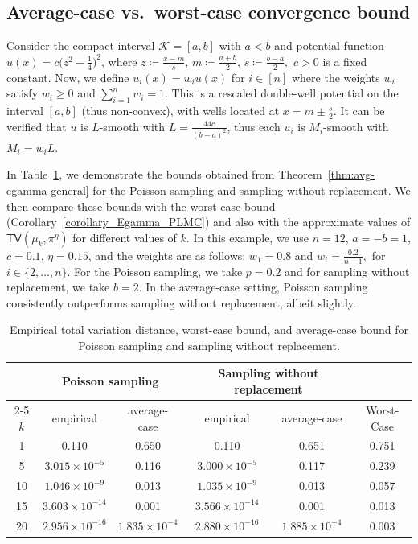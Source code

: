 \documentclass[10pt, journal]{IEEEtran}
\begin{document}
\subsection{Average-case vs.\ worst-case convergence bound}
\label{app:averageVSworst}
Consider the compact interval $\mathcal K=[a,b]$ with $a<b$ and potential function $u(x)=c\big(z^2-\tfrac14\big)^2$, where $z\coloneqq\frac{x-m}{s}$, $m\coloneqq \frac{a+b}{2}$,   $s\coloneqq \frac{b-a}{2},$ $c>0$ is a fixed constant. Now, we define $u_i(x) = w_i u(x)$ for $i\in [n]$ where the weights $w_i$ satisfy $w_i\geq 0$ and $\sum_{i=1}^nw_i=1$. This is a rescaled double-well potential on the interval $[a,b]$ (thus non-convex), with wells located at $x = m \pm \frac{s}{2}$. It can be verified that $u$ is $L$-smooth with $L = \tfrac{44c}{(b-a)^2}$, thus each $u_i$ is $M_i$-smooth with $M_i = w_i L$. 


In Table~\ref{tab:tv-poisson-swr2}, we demonstrate the bounds obtained from Theorem~\ref{thm:avg-egamma-general} for the Poisson sampling and sampling without replacement. We then compare these bounds with the worst-case bound (Corollary~\ref{corollary_Egamma_PLMC}) and also with the approximate values of $\mathsf{TV}(\mu_k, \pi^\eta)$ for different values of $k$. In this example, we use $n= 12$, $a = -b = 1$, $c=0.1$, $\eta=0.15$, and the weights are as follows: $w_1=0.8$ and $w_i=\frac{0.2}{n-1},$ for $i\in \{2,\dots,n\}$. For the Poisson sampling, we take $p = 0.2$ and for sampling without replacement, we take $b = 2$. In the average-case setting, Poisson sampling consistently outperforms sampling without replacement, albeit slightly.
\begin{table}[t]
\centering
\caption{Empirical total variation distance, worst-case bound, and average-case bound for Poisson sampling and sampling without replacement.}
\label{tab:tv-poisson-swr2}
\begin{tabular}{|c | c | c | c | c | c |}
\hline
 & \multicolumn{2}{c}{Poisson sampling} \vline & \multicolumn{2}{c}{Sampling without replacement} \vline & \\
 \cline{2-5}
$k$ & empirical & average-case & empirical & average-case & Worst-Case\\
\hline
1  & 0.110 & 0.650 & 0.110 & 0.651 & 0.751 \\
5  & $3.015\times 10^{-5}$ & 0.116 & $3.000\times 10^{-5}$ & 0.117 & 0.239\\
10 & $1.046\times 10^{-9}$ & 0.013 & $1.035\times 10^{-9}$ & 0.013 & 0.057\\
15 & $3.603\times 10^{-14}$ & 0.001 & $3.566\times 10^{-14}$ & 0.001 & 0.013\\
20 & $2.956\times 10^{-16}$ & $1.835\times 10^{-4}$ & $2.880\times 10^{-16}$ & $1.885\times 10^{-4}$ & 0.003 \\
\hline
\end{tabular}
\end{table}
\end{document}
